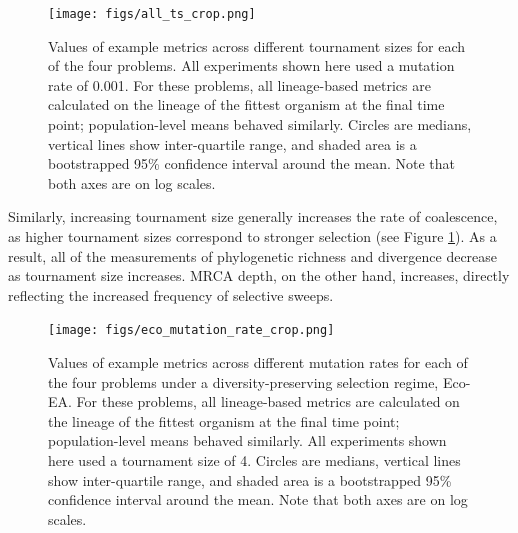 \documentclass[letterpaper]{article}
\newcommand{\reduceCaptionPadding}{\setlength{\belowcaptionskip}{-10pt}}
\begin{document}
\begin{figure}
\centering
\texttt{[image: figs/all\_ts\_crop.png]}
\reduceCaptionPadding
\caption{\small Values of example metrics across different tournament sizes for each of the four problems. All experiments shown here used a mutation rate of 0.001. For these problems, all lineage-based metrics are calculated on the lineage of the fittest organism at the final time point; population-level means behaved similarly. Circles are medians, vertical lines show inter-quartile range, and shaded area is a bootstrapped 95\% confidence interval around the mean. Note that both axes are on log scales.}
\label{fig:ts}
\end{figure}

Similarly, increasing tournament size generally increases the rate of coalescence, as higher tournament sizes correspond to stronger selection (see Figure \ref{fig:ts}). As a result, all of the measurements of phylogenetic richness and divergence decrease as tournament size increases. MRCA depth, on the other hand, increases, directly reflecting the increased frequency of selective sweeps. 

\begin{figure}
\centering
\texttt{[image: figs/eco\_mutation\_rate\_crop.png]}
\reduceCaptionPadding
\caption{\small Values of example metrics across different mutation rates for each of the four problems under a diversity-preserving selection regime, Eco-EA. For these problems, all lineage-based metrics are calculated on the lineage of the fittest organism at the final time point; population-level means behaved similarly. All experiments shown here used a tournament size of 4. Circles are medians, vertical lines show inter-quartile range, and shaded area is a bootstrapped 95\% confidence interval around the mean. Note that both axes are on log scales.}
\label{fig:ecology}
\end{figure}
\end{document}
